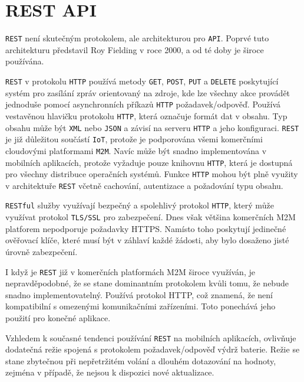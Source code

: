 \documentclass[czech,BP]{thesiskiv}
\begin{document}
		\section{REST API}	
		
		\texttt{REST} není skutečným protokolem, ale architekturou pro \texttt{API}. Poprvé tuto architekturu představil Roy Fielding v roce 2000, a od té doby je široce používána.\cite{karagiannis2015survey}
		
		 \texttt{REST} v protokolu \texttt{HTTP} používá metody \texttt{GET}, \texttt{POST}, \texttt{PUT} a \texttt{DELETE} poskytující systém pro zasílání zpráv orientovaný na zdroje, kde lze všechny akce provádět jednoduše pomocí asynchronních příkazů \texttt{HTTP} požadavek/odpověď. Používá vestavěnou hlavičku protokolu \texttt{HTTP}, která označuje formát dat v obsahu. Typ obsahu může být \texttt{XML} nebo \texttt{JSON} a závisí na serveru \texttt{HTTP} a jeho konfiguraci. \texttt{REST} je již důležitou součástí \texttt{IoT}, protože je podporována všemi komerčními cloudovými platformami \texttt{M2M}. Navíc může být snadno implementována v mobilních aplikacích, protože vyžaduje pouze knihovnu \texttt{HTTP}, která je dostupná pro všechny distribuce operačních systémů. Funkce \texttt{HTTP} mohou být plně využity v architektuře \texttt{REST} včetně cachování, autentizace a požadování typu obsahu.\cite{karagiannis2015survey}
		 
		 \texttt{RESTful} služby využívají bezpečný a spolehlivý protokol \texttt{HTTP}, který může využívat protokol \texttt{TLS/SSL} pro zabezpečení. Dnes však většina komerčních M2M platforem nepodporuje požadavky HTTPS. Namísto toho poskytují jedinečné ověřovací klíče, které musí být v záhlaví každé žádosti, aby bylo dosaženo jisté úrovně zabezpečení.\cite{karagiannis2015survey} 
		 
		 I když je \texttt{REST} již v komerčních platformách M2M široce využíván, je nepravděpodobné, že se stane dominantním protokolem kvůli tomu, že nebude snadno implementovatelný. Používá protokol HTTP, což znamená, že není kompatibilní s omezenými komunikačními zařízeními. Toto ponechává jeho použití pro konečné aplikace.\cite{karagiannis2015survey} 
		 
		 Vzhledem k současné tendenci používání \texttt{REST} na mobilních aplikacích, ovlivňuje dodatečná režie spojená s protokolem požadavek/odpověď výdrž baterie. Režie se stane zbytečnou při nepřetržitém volání a dlouhém dotazování na hodnoty, zejména v případě, že nejsou k dispozici nové aktualizace.\cite{karagiannis2015survey}
\end{document}
